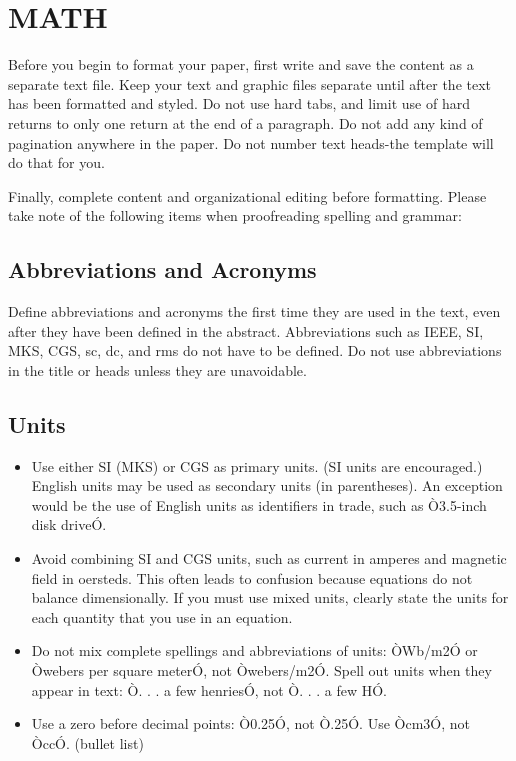 \documentclass[letterpaper, 10 pt, conference]{ieeeconf}  %
\begin{document}
\section{MATH}

Before you begin to format your paper, first write and save the content as a separate text file. Keep your text and graphic files separate until after the text has been formatted and styled. Do not use hard tabs, and limit use of hard returns to only one return at the end of a paragraph. Do not add any kind of pagination anywhere in the paper. Do not number text heads-the template will do that for you.

Finally, complete content and organizational editing before formatting. Please take note of the following items when proofreading spelling and grammar:

\subsection{Abbreviations and Acronyms} Define abbreviations and acronyms the first time they are used in the text, even after they have been defined in the abstract. Abbreviations such as IEEE, SI, MKS, CGS, sc, dc, and rms do not have to be defined. Do not use abbreviations in the title or heads unless they are unavoidable.

\subsection{Units}

\begin{itemize}

\item Use either SI (MKS) or CGS as primary units. (SI units are encouraged.) English units may be used as secondary units (in parentheses). An exception would be the use of English units as identifiers in trade, such as Ò3.5-inch disk driveÓ.
\item Avoid combining SI and CGS units, such as current in amperes and magnetic field in oersteds. This often leads to confusion because equations do not balance dimensionally. If you must use mixed units, clearly state the units for each quantity that you use in an equation.
\item Do not mix complete spellings and abbreviations of units: ÒWb/m2Ó or Òwebers per square meterÓ, not Òwebers/m2Ó.  Spell out units when they appear in text: Ò. . . a few henriesÓ, not Ò. . . a few HÓ.
\item Use a zero before decimal points: Ò0.25Ó, not Ò.25Ó. Use Òcm3Ó, not ÒccÓ. (bullet list)

\end{itemize}
\end{document}
